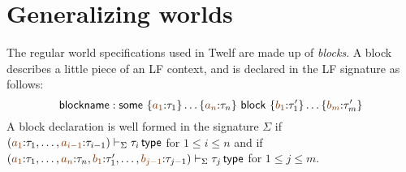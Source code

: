 







\section{Generalizing worlds}

The regular world specifications used in Twelf are made up of {\it
  blocks}. A block describes a little piece of an LF context, and
is declared in the LF signature as follows:
\[
 {\sf blockname} :
 {\sf some}~\{\lf{a_1}{:}\tau_1\}\ldots\{\lf{a_n}{:}\tau_n\}
~{\sf block}~\{\lf{b_1}{:}\tau'_1\}\ldots\{\lf{b_m}{:}\tau'_m\}
\]
A block declaration is well formed in the signature $\Sigma$ if 
$\left(\lf{a_1}{:}\tau_1,\ldots,\lf{a_{i-1}}{:} \tau_{i-1} \right)\vdash_\Sigma
\tau_i \,{\sf type}$ for $1 \leq i \leq n$ and if 
$\left(\lf{a_1}{:}\tau_1,\ldots,\lf{a_{n}}{:} \tau_{n},
 \lf{b_1}{:}\tau'_1,\ldots,\lf{b_{j-1}}{:}\tau_{j-1}\right) \vdash_\Sigma
\tau_j \,{\sf type}$ for $1 \leq j \leq m$. 

